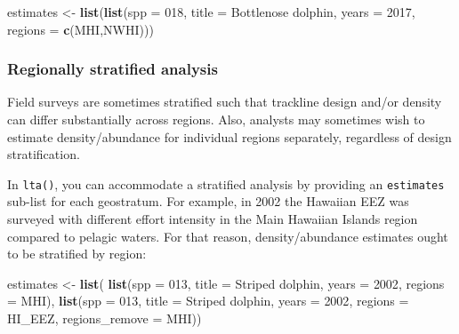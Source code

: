 \documentclass[
]{book}
\newenvironment{Shaded}{\begin{snugshade}}{\end{snugshade}}
\newcommand{\AttributeTok}[1]{\textcolor[rgb]{0.13,0.29,0.53}{#1}}
\newcommand{\DecValTok}[1]{\textcolor[rgb]{0.00,0.00,0.81}{#1}}
\newcommand{\FunctionTok}[1]{\textcolor[rgb]{0.13,0.29,0.53}{\textbf{#1}}}
\newcommand{\NormalTok}[1]{#1}
\newcommand{\OtherTok}[1]{\textcolor[rgb]{0.56,0.35,0.01}{#1}}
\newcommand{\StringTok}[1]{\textcolor[rgb]{0.31,0.60,0.02}{#1}}
\begin{document}
\begin{Shaded}
\begin{Highlighting}[]
\NormalTok{estimates }\OtherTok{\textless{}{-}} \FunctionTok{list}\NormalTok{(}\FunctionTok{list}\NormalTok{(}\AttributeTok{spp =} \StringTok{\textquotesingle{}018\textquotesingle{}}\NormalTok{,}
                       \AttributeTok{title =} \StringTok{\textquotesingle{}Bottlenose dolphin\textquotesingle{}}\NormalTok{,}
                       \AttributeTok{years =} \DecValTok{2017}\NormalTok{,}
                       \AttributeTok{regions =} \FunctionTok{c}\NormalTok{(}\StringTok{\textquotesingle{}MHI\textquotesingle{}}\NormalTok{,}\StringTok{\textquotesingle{}NWHI\textquotesingle{}}\NormalTok{)))}
\end{Highlighting}
\end{Shaded}

\hypertarget{regionally-stratified-analysis}{%
\subsubsection*{Regionally stratified analysis}\label{regionally-stratified-analysis}}

Field surveys are sometimes stratified such that trackline design and/or density can differ substantially across regions. Also, analysts may sometimes wish to estimate density/abundance for individual regions separately, regardless of design stratification.

In \texttt{lta()}, you can accommodate a stratified analysis by providing an \texttt{estimates} sub-list for each geostratum. For example, in 2002 the Hawaiian EEZ was surveyed with different effort intensity in the Main Hawaiian Islands region compared to pelagic waters. For that reason, density/abundance estimates ought to be stratified by region:

\begin{Shaded}
\begin{Highlighting}[]
\NormalTok{estimates }\OtherTok{\textless{}{-}} \FunctionTok{list}\NormalTok{(}
    \FunctionTok{list}\NormalTok{(}\AttributeTok{spp =} \StringTok{\textquotesingle{}013\textquotesingle{}}\NormalTok{,}
         \AttributeTok{title =} \StringTok{\textquotesingle{}Striped dolphin\textquotesingle{}}\NormalTok{,}
         \AttributeTok{years =} \DecValTok{2002}\NormalTok{,}
         \AttributeTok{regions =} \StringTok{\textquotesingle{}MHI\textquotesingle{}}\NormalTok{),}
    \FunctionTok{list}\NormalTok{(}\AttributeTok{spp =} \StringTok{\textquotesingle{}013\textquotesingle{}}\NormalTok{,}
         \AttributeTok{title =} \StringTok{\textquotesingle{}Striped dolphin\textquotesingle{}}\NormalTok{,}
         \AttributeTok{years =} \DecValTok{2002}\NormalTok{,}
         \AttributeTok{regions =} \StringTok{\textquotesingle{}HI\_EEZ\textquotesingle{}}\NormalTok{,}
         \AttributeTok{regions\_remove =} \StringTok{\textquotesingle{}MHI\textquotesingle{}}\NormalTok{))}
\end{Highlighting}
\end{Shaded}
\end{document}
